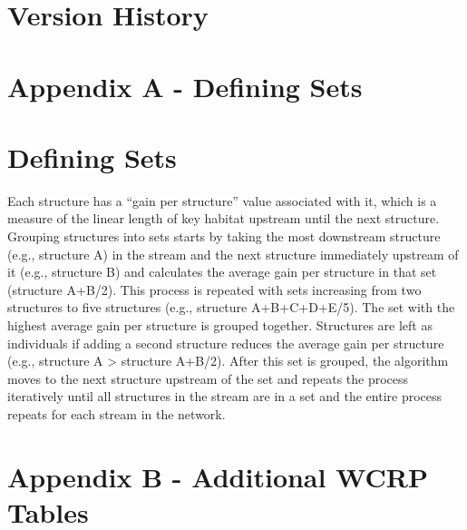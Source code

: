 \documentclass[
  letterpaper,
  DIV=11,
  numbers=noendperiod]{scrreprt}
\begin{document}

\chapter*{Version History}\label{version-history}


\cleardoublepage
{}
{}
\appendix

\chapter*{Appendix A - Defining Sets}\label{appendix-a---defining-sets}


\chapter*{Defining Sets}\label{defining-sets}


Each structure has a ``gain per structure'' value associated with it,
which is a measure of the linear length of key habitat upstream until
the next structure. Grouping structures into sets starts by taking the
most downstream structure (e.g., structure A) in the stream and the next
structure immediately upstream of it (e.g., structure B) and calculates
the average gain per structure in that set (structure A+B/2). This
process is repeated with sets increasing from two structures to five
structures (e.g., structure A+B+C+D+E/5). The set with the highest
average gain per structure is grouped together. Structures are left as
individuals if adding a second structure reduces the average gain per
structure (e.g., structure A \textgreater{} structure A+B/2). After this
set is grouped, the algorithm moves to the next structure upstream of
the set and repeats the process iteratively until all structures in the
stream are in a set and the entire process repeats for each stream in
the network.

\chapter*{Appendix B - Additional WCRP
Tables}\label{appendix-b---additional-wcrp-tables}
\end{document}
